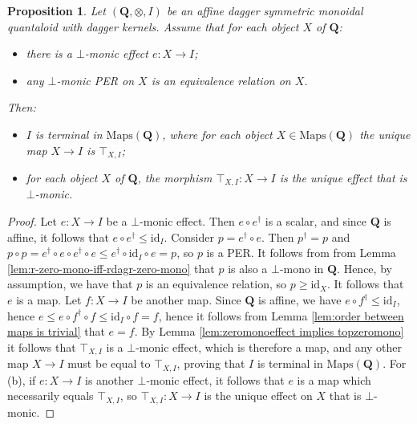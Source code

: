 \documentclass[12pt]{tac}
\newtheorem{proposition}[theorem]{Proposition}
\theoremstyle{definition}
\theoremstyle{remark}
\newcommand{\<}{\langle}
\renewcommand{\>}{\rangle}
\renewcommand{\:}{\colon}
\newcommand{\id}{\mathrm{id}}
\begin{document}
\begin{proposition}\label{prop:PER}
    Let $(\mathbf Q,\otimes,I)$ be an affine dagger symmetric monoidal quantaloid with dagger kernels. Assume that for each object $X$ of $\mathbf Q$: 
    \begin{itemize}
           \item[(1)] there is a $\bot$-monic effect $e:X\to I$;
                \item[(2)] any $\bot$-monic PER on $X$ is an equivalence relation on $X$.
    \end{itemize}
    Then:
    \begin{itemize}
        \item[(a)] $I$ is terminal in $\mathrm{Maps}(\mathbf Q)$, where for each object $X\in\mathrm{Maps}(\mathbf Q)$ the unique map $X\to I$ is $\top_{X,I}$;
        \item[(b)] for each object $X$ of $\mathbf Q$, the morphism $\top_{X,I}:X\to I$ is the unique effect that is $\bot$-monic.
    \end{itemize}
\end{proposition}
\begin{proof}
Let $e:X\to I$ be a $\bot$-monic effect. Then $e\circ e^\dag$ is a scalar, and since $\mathbf Q$ is affine, it follows that $e\circ e^\dag\leq\id_I$.  Consider $p=e^\dag\circ e$. Then $p^\dag=p$ and $p\circ p=e^\dag\circ e\circ e^\dag\circ e\leq e^\dag\circ\id_I\circ e=p$, so $p$ is a PER. It follows from from Lemma \ref{lem:r-zero-mono-iff-rdagr-zero-mono} that $p$ is also a $\bot$-mono in $\mathbf Q$. Hence, by assumption, we have that $p$ is an equivalence relation, so $p\geq\id_X$. It follows that $e$ is a map. Let $f:X\to I$ be another map. Since $\mathbf Q$ is affine, we have $e\circ f^\dag\leq\id_I$, hence $e\leq e\circ f^\dag\circ f\leq\id_I\circ f=f$, hence it follows from Lemma \ref{lem:order between maps is trivial} that $e=f$.  By Lemma \ref{lem:zeromonoeffect implies topzeromono} it follows that $\top_{X,I}$ is a $\bot$-monic effect, which is therefore a map, and any other map $X\to I$ must be equal to $\top_{X,I}$, proving that $I$ is terminal in $\mathrm{Maps}(\mathbf Q)$. For (b), if $e:X\to I$ is another $\bot$-monic effect, it follows that $e$ is a map which necessarily equals $\top_{X,I}$, so $\top_{X,I}:X\to I$ is the unique effect on $X$ that is $\bot$-monic.
\end{proof}
\end{document}
